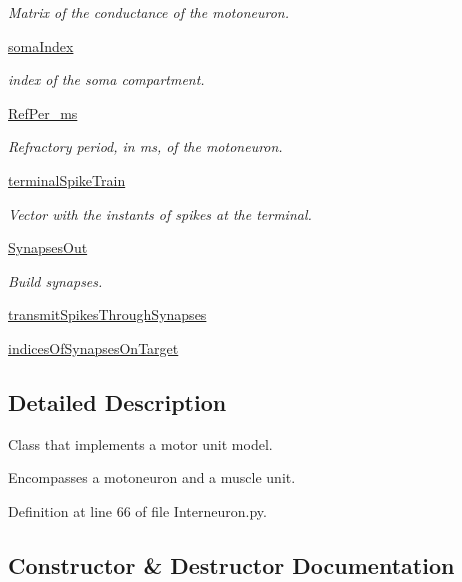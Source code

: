 \begin{DoxyCompactItemize}
\begin{DoxyCompactList}\small\item\em Matrix of the conductance of the motoneuron. \end{DoxyCompactList}\item 
\hyperlink{class_interneuron_1_1_interneuron_aee67796d78acb7bea5aa67ec3df379a8}{soma\+Index}
\begin{DoxyCompactList}\small\item\em index of the soma compartment. \end{DoxyCompactList}\item 
\hyperlink{class_interneuron_1_1_interneuron_a4e036434222711a311d3299516795dd5}{Ref\+Per\+\_\+ms}
\begin{DoxyCompactList}\small\item\em Refractory period, in ms, of the motoneuron. \end{DoxyCompactList}\item 
\hyperlink{class_interneuron_1_1_interneuron_aa345954910a8c7b304d0c18b53f20480}{terminal\+Spike\+Train}
\begin{DoxyCompactList}\small\item\em Vector with the instants of spikes at the terminal. \end{DoxyCompactList}\item 
\hyperlink{class_interneuron_1_1_interneuron_acf20c20262841403db13c5d69e4cb840}{Synapses\+Out}
\begin{DoxyCompactList}\small\item\em Build synapses. \end{DoxyCompactList}\item 
\hyperlink{class_interneuron_1_1_interneuron_a045e133d9975922a3f6865c01cfd6dbb}{transmit\+Spikes\+Through\+Synapses}
\item 
\hyperlink{class_interneuron_1_1_interneuron_aae8e79cf5c696fb7e7cae3e8f93db55b}{indices\+Of\+Synapses\+On\+Target}
\end{DoxyCompactItemize}


\subsection{Detailed Description}
Class that implements a motor unit model. 

Encompasses a motoneuron and a muscle unit. 

Definition at line 66 of file Interneuron.\+py.



\subsection{Constructor \& Destructor Documentation}
